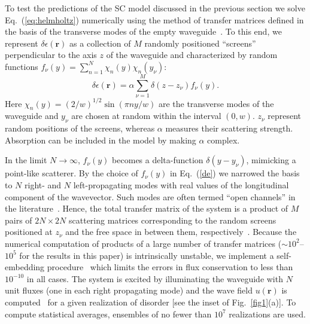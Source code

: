 To test the predictions of the SC model discussed in the previous section we solve Eq.~(\ref{eq:helmholtz}) numerically using the method of transfer matrices defined in the basis of the transverse modes of the empty waveguide~\cite{2007_Froufe-Perez_PRE,2010_Payne_closed}. To this end, we represent $\delta \epsilon(\mathbf{r})$ as a collection of $M$ randomly positioned ``screens'' perpendicular to the axis $z$ of the waveguide and characterized by random functions $f_{\nu}(y) = \sum_{n=1}^N \chi_n(y)\chi_n(y_\nu)$:
\begin{equation}
\delta\epsilon(\mathbf{r}) = \alpha\sum\limits_{\nu=1}^M \delta(z - z_\nu)f_\nu(y).
\label{de}
\end{equation}
Here $\chi_n(y) = (2/w)^{1/2}\sin(\pi ny/w)$ are the transverse modes of the waveguide and $y_\nu$ are chosen at random within the interval $(0, w)$. $z_\nu$ represent random positions of the screens, whereas $\alpha$ measures their scattering strength. Absorption can be included in the model by making $\alpha$ complex.

In the limit $N\rightarrow\infty$, $f_\nu(y)$ becomes a delta-function $\delta\left(y-y_\nu\right)$, mimicking a point-like scatterer. By the choice of $f_\nu(y)$ in Eq.~(\ref{de}) we narrowed the basis to $N$ right- and $N$ left-propagating modes with real values of the longitudinal component of the wavevector. Such modes are often termed ``open channels'' in the literature~\cite{2007_Froufe-Perez_PRE}. Hence, the total transfer matrix of the system is a product of $M$ pairs of $2N\times 2N$ scattering matrices corresponding to the random screens positioned at $z_{\nu}$ and the free space in between them, respectively~\cite{2010_Payne_closed}. Because the numerical computation of products of a large number of transfer matrices ($\sim 10^2$--$10^5$ for the results in this paper) is intrinsically unstable, we implement a self-embedding procedure~\cite{1999_yamilov_selfembed} which limits the errors in flux conservation to less than $10^{-10}$ in all cases. The system is excited by illuminating the waveguide with $N$ unit fluxes (one in each right propagating mode) and the wave field $u(\mathbf{r})$ is computed~\cite{1999_yamilov_selfembed,2010_Payne_closed} for a given realization of disorder [see the inset of Fig.~\ref{fig1}(a)]. To compute statistical averages, ensembles of no fewer than $10^7$ realizations are used.

